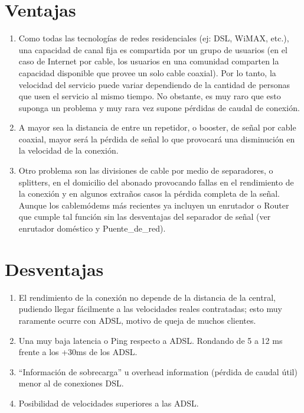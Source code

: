 \documentclass{report}
\begin{document}
\section*{Ventajas}
\begin{enumerate}
\item Como todas las tecnologías de redes residenciales (ej: DSL, WiMAX, etc.), una capacidad de canal fija es compartida por un grupo de usuarios (en el caso de Internet por cable, los usuarios en una comunidad comparten la capacidad disponible que provee un solo cable coaxial). Por lo tanto, la velocidad del servicio puede variar dependiendo de la cantidad de personas que usen el servicio al mismo tiempo. No obstante, es muy raro que esto suponga un problema y muy rara vez supone pérdidas de caudal de conexión.
\item A mayor sea la distancia de entre un repetidor, o booster, de señal por cable coaxial, mayor será la pérdida de señal lo que provocará una disminución en la velocidad de la conexión.
\item Otro problema son las divisiones de cable por medio de separadores, o splitters, en el domicilio del abonado provocando fallas en el rendimiento de la conexión y en algunos extraños casos la pérdida completa de la señal. Aunque los cablemódems más recientes ya incluyen un enrutador o Router que cumple tal función sin las desventajas del separador de señal (ver enrutador doméstico y Puente\_de\_red).
\end{enumerate}
\section*{Desventajas}
\begin{enumerate}
\item El rendimiento de la conexión no depende de la distancia de la central, pudiendo llegar fácilmente a las velocidades reales contratadas; esto muy raramente ocurre con ADSL, motivo de queja de muchos clientes.
\item Una muy baja latencia o Ping respecto a ADSL. Rondando de 5 a 12 ms frente a los +30ms de los ADSL.
\item ``Información de sobrecarga'' u overhead information (pérdida de caudal útil) menor al de conexiones DSL.
\item Posibilidad de velocidades superiores a las ADSL.
\end{enumerate}
\newpage
\end{document}
